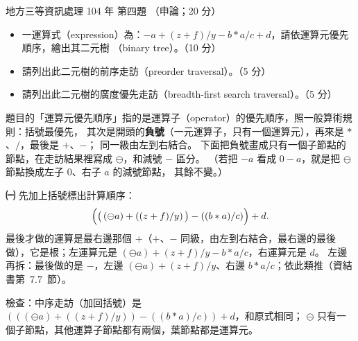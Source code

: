 \begin{pastexam}[label={px:df3-104-ds-04}]{地方三等資訊處理 104 年 第四題}
（申論；20 分）

\begin{itemize}[leftmargin=2em, labelsep=0.3em, itemsep=2pt]
\item[㈠] 一運算式（expression）為：$-a+(z+f)/y-b*a/c+d$，請依運算元優先順序，繪出其二元樹
（binary tree）。（10 分）
\item[㈡] 請列出此二元樹的前序走訪（preorder traversal）。（5 分）
\item[㈢] 請列出此二元樹的廣度優先走訪（breadth-first search traversal）。（5 分）
\end{itemize}
\end{pastexam}

\begin{pastsoln}
題目的「運算元優先順序」指的是運算子（operator）的優先順序，照一般算術規則：括號最優先，
其次是開頭的\textbf{負號}（一元運算子，只有一個運算元），再來是 $*$、$/$，最後是 $+$、$-$；
同一級由左到右結合。 下面把負號畫成只有一個子節點的節點，在走訪結果裡寫成 $\ominus$，和減號
$-$ 區分。 （若把 $-a$ 看成 $0 - a$，就是把 $\ominus$ 節點換成左子 $0$、右子 $a$ 的減號節點，
其餘不變。）

\textbf{㈠} 先加上括號標出計算順序：
\[
\Bigl(\bigl(\,(\ominus a) + ((z + f) / y)\,\bigr) - ((b * a) / c)\Bigr) + d .
\]
最後才做的運算是最右邊那個 $+$（$+$、$-$ 同級，由左到右結合，最右邊的最後做），它是根；左運算元是
$(\ominus a) + (z+f)/y - b*a/c$，右運算元是 $d$。 左邊再拆：最後做的是 $-$，左邊
$(\ominus a) + (z+f)/y$、右邊 $b*a/c$；依此類推（資結書第~7.7~節）。
\begin{center}
\end{center}
檢查：中序走訪（加回括號）是 $(((\ominus a) + ((z+f)/y)) - ((b*a)/c)) + d$，和原式相同；
$\ominus$ 只有一個子節點，其他運算子節點都有兩個，葉節點都是運算元。


\end{pastsoln}
